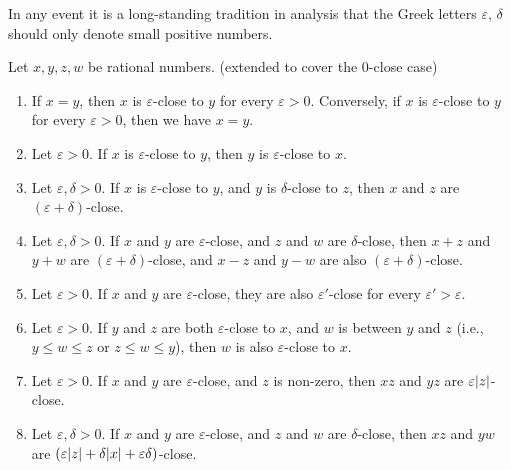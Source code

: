 \begin{note}
    In any event it is a long-standing tradition in analysis that the Greek letters \(\varepsilon\), \(\delta\) should only denote small positive numbers.
\end{note}

\setcounter{theorem}{6}
\begin{proposition}\label{4.3.7}
    Let \(x, y, z, w\) be rational numbers.
    (extended to cover the \(0\)-close case)
    \begin{enumerate}
        \item If \(x = y\), then \(x\) is \(\varepsilon\)-close to \(y\) for every \(\varepsilon > 0\).
              Conversely, if \(x\) is \(\varepsilon\)-close to \(y\) for every \(\varepsilon > 0\), then we have \(x = y\).
        \item Let \(\varepsilon > 0\).
              If \(x\) is \(\varepsilon\)-close to \(y\), then \(y\) is \(\varepsilon\)-close to \(x\).
        \item Let \(\varepsilon, \delta > 0\).
              If \(x\) is \(\varepsilon\)-close to \(y\), and \(y\) is \(\delta\)-close to \(z\), then \(x\) and \(z\) are \((\varepsilon + \delta)\)-close.
        \item Let \(\varepsilon, \delta > 0\).
              If \(x\) and \(y\) are \(\varepsilon\)-close, and \(z\) and \(w\) are \(\delta\)-close, then \(x + z\) and \(y + w\) are \((\varepsilon + \delta)\)-close, and \(x - z\) and \(y - w\) are also \((\varepsilon + \delta)\)-close.
        \item Let \(\varepsilon > 0\).
              If \(x\) and \(y\) are \(\varepsilon\)-close, they are also \(\varepsilon'\)-close for every \(\varepsilon' > \varepsilon\).
        \item Let \(\varepsilon > 0\).
              If \(y\) and \(z\) are both \(\varepsilon\)-close to \(x\), and \(w\) is between \(y\) and \(z\) (i.e., \(y \leq w \leq z\) or \(z \leq w \leq y\)), then \(w\) is also \(\varepsilon\)-close to \(x\).
        \item Let \(\varepsilon > 0\).
              If \(x\) and \(y\) are \(\varepsilon\)-close, and \(z\) is non-zero, then \(xz\) and \(yz\) are \(\varepsilon\abs*{z}\)-close.
        \item Let \(\varepsilon, \delta > 0\).
              If \(x\) and \(y\) are \(\varepsilon\)-close, and \(z\) and \(w\) are \(\delta\)-close, then \(xz\) and \(yw\) are \((\varepsilon\abs*{z} + \delta\abs*{x} + \varepsilon\delta)\)-close.
    \end{enumerate}
\end{proposition}

